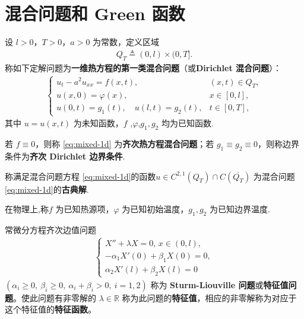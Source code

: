 \documentclass[../../main.tex]{subfiles}%
\begin{document}
\section{混合问题和 Green 函数}

\begin{definition}
设 $l>0$，$T>0$，$a>0$ 为常数，定义区域
\begin{align*}
Q_T\triangleq (0,l)\times(0,T].
\end{align*}
称如下定解问题为\textbf{一维热方程的第一类混合问题}（或\textbf{Dirichlet 混合问题}）：
\begin{align}
\begin{cases}
u_t-a^2u_{xx}=f(x,t), & (x,t)\in Q_T,\\
u(x,0)=\varphi(x), & x\in[0,l],\\
u(0,t)=g_1(t),\quad u(l,t)=g_2(t), & t\in[0,T],
\end{cases} \label{eq:mixed-1d}
\end{align}
其中 $u=u(x,t)$ 为未知函数，$f$ ,$\varphi$,$g_1,g_2$ 均为已知函数.

若 $f\equiv 0$，则称 \eqref{eq:mixed-1d} 为\textbf{齐次热方程混合问题}；若 $g_1\equiv g_2\equiv 0$，则称边界条件为\textbf{齐次 Dirichlet 边界条件}.

称满足混合问题方程 \eqref{eq:mixed-1d}的函数$u\in C^{2,1}(Q_T)\cap C(\overline{Q_T})$ 为混合问题\eqref{eq:mixed-1d}的\textbf{古典解}.
\end{definition}
\begin{remark}
在物理上,称$f$ 为已知热源项，$\varphi$ 为已知初始温度，$g_1,g_2$ 为已知边界温度.
\end{remark}

\begin{definition}
常微分方程齐次边值问题
\begin{align}
\begin{cases}
X''+\lambda X=0,\, x\in(0,l), \\
-\alpha_1X'(0)+\beta_1X(0)=0, \\
\alpha_2X'(l)+\beta_2X(l)=0
\end{cases} \label{eq:sturm-liouville}
\end{align}
$(\alpha_i\geqslant 0,\ \beta_i\geqslant 0,\ \alpha_i+\beta_i>0,\ i=1,2)$ 称为 \textbf{Sturm-Liouville 问题}或\textbf{特征值问题}。使此问题有非零解的 $\lambda\in\mathbb{R}$ 称为此问题的\textbf{特征值}，相应的非零解称为对应于这个特征值的\textbf{特征函数}。
\end{definition}
\end{document}
